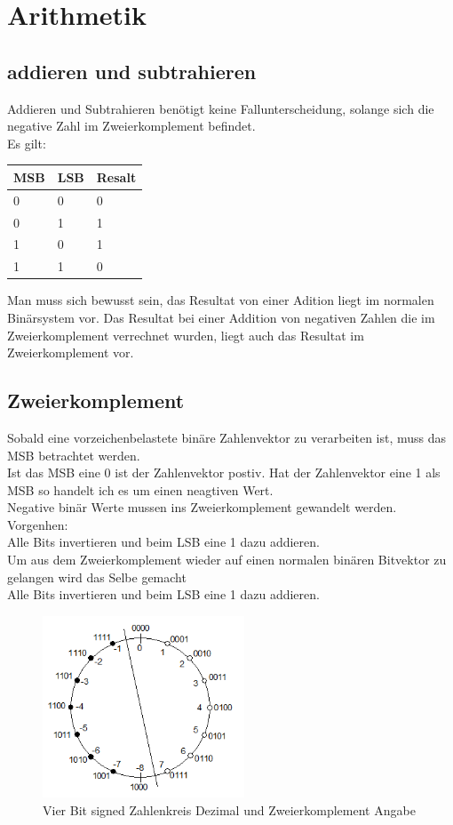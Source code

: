 \section{Arithmetik}
\subsection{addieren und subtrahieren}
Addieren und Subtrahieren benötigt keine Fallunterscheidung, solange sich die 
negative Zahl im Zweierkomplement befindet.\\
Es gilt:\\
\begin{table}[h]
\begin{tabular}{ll|l}

MSB & LSB & Resalt \\ \hline
0   & 0   & 0      \\ 
0   & 1   & 1      \\ 
1   & 0   & 1      \\ 
1   & 1   & 0      \\ 
\end{tabular}
\end{table}

\noindent Man muss sich bewusst sein, das Resultat von einer Adition liegt im 
normalen Binärsystem vor. Das Resultat bei einer Addition von negativen Zahlen 
die im Zweierkomplement verrechnet wurden, liegt auch das Resultat im 
Zweierkomplement vor.

\subsection{Zweierkomplement}
Sobald eine vorzeichenbelastete binäre Zahlenvektor zu verarbeiten ist, muss 
das MSB betrachtet werden.\\
Ist das MSB eine 0 ist der Zahlenvektor postiv. Hat der Zahlenvektor eine 1 
als MSB so handelt ich es um einen neagtiven Wert.
\\
Negative binär Werte mussen ins Zweierkomplement gewandelt werden.\\
Vorgenhen:\\
Alle Bits invertieren und beim LSB eine 1 dazu addieren.
\\
Um aus dem Zweierkomplement wieder auf einen normalen binären Bitvektor zu 
gelangen wird das Selbe gemacht\\
Alle Bits invertieren und beim LSB eine 1 dazu addieren.
\begin{figure}[htbp]
	\centering
		\includegraphics[width=6cm]{content/bilder/Zahlenkreis.png}
	\caption{Vier Bit signed Zahlenkreis Dezimal und Zweierkomplement Angabe}%
	\label{Zahlenkreis}
\end{figure}

